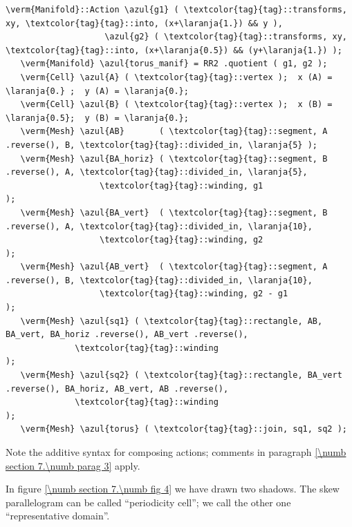 \begin{Verbatim}[commandchars=\\\{\},formatcom=\small\tt,frame=single,
   label=parag-\ref{\numb section 7.\numb parag 8}.cpp,rulecolor=\color{moldura},
   baselinestretch=0.94,framesep=2mm                                            ]
   \verm{Manifold}::Action \azul{g1} ( \textcolor{tag}{tag}::transforms, xy, \textcolor{tag}{tag}::into, (x+\laranja{1.}) && y ),
                    \azul{g2} ( \textcolor{tag}{tag}::transforms, xy, \textcolor{tag}{tag}::into, (x+\laranja{0.5}) && (y+\laranja{1.}) );
   \verm{Manifold} \azul{torus_manif} = RR2 .quotient ( g1, g2 );
   \verm{Cell} \azul{A} ( \textcolor{tag}{tag}::vertex );  x (A) = \laranja{0.} ;  y (A) = \laranja{0.};
   \verm{Cell} \azul{B} ( \textcolor{tag}{tag}::vertex );  x (B) = \laranja{0.5};  y (B) = \laranja{0.};
   \verm{Mesh} \azul{AB}       ( \textcolor{tag}{tag}::segment, A .reverse(), B, \textcolor{tag}{tag}::divided_in, \laranja{5} );
   \verm{Mesh} \azul{BA_horiz} ( \textcolor{tag}{tag}::segment, B .reverse(), A, \textcolor{tag}{tag}::divided_in, \laranja{5},
                   \textcolor{tag}{tag}::winding, g1                                  );
   \verm{Mesh} \azul{BA_vert}  ( \textcolor{tag}{tag}::segment, B .reverse(), A, \textcolor{tag}{tag}::divided_in, \laranja{10},
                   \textcolor{tag}{tag}::winding, g2                                   );
   \verm{Mesh} \azul{AB_vert}  ( \textcolor{tag}{tag}::segment, A .reverse(), B, \textcolor{tag}{tag}::divided_in, \laranja{10},
                   \textcolor{tag}{tag}::winding, g2 - g1                              );
   \verm{Mesh} \azul{sq1} ( \textcolor{tag}{tag}::rectangle, AB, BA_vert, BA_horiz .reverse(), AB_vert .reverse(),
              \textcolor{tag}{tag}::winding                                                         );
   \verm{Mesh} \azul{sq2} ( \textcolor{tag}{tag}::rectangle, BA_vert .reverse(), BA_horiz, AB_vert, AB .reverse(),
              \textcolor{tag}{tag}::winding                                                         );
   \verm{Mesh} \azul{torus} ( \textcolor{tag}{tag}::join, sq1, sq2 );
\end{Verbatim}

Note the additive syntax for composing actions; comments in paragraph
\ref{\numb section 7.\numb parag 3} apply.

In figure \ref{\numb section 7.\numb fig 4} we have drawn two shadows.
The skew parallelogram can be called ``periodicity cell'';
we call the other one ``representative domain''.

